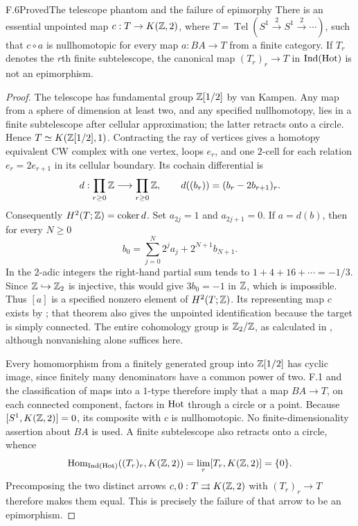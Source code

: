 \begin{claim}{F.6}{Proved}{The telescope phantom and the failure of epimorphy}
There is an essential unpointed map
$c:T\to K(\mathbb Z,2)$, where
$T=\operatorname{Tel}(S^1\xrightarrow{2}S^1\xrightarrow{2}\cdots)$,
such that $c\circ a$ is nullhomotopic for every map $a:BA\to T$
from a finite category. If $T_r$ denotes the $r$th finite
subtelescope, the canonical map $(T_r)_r\to T$ in $\operatorname{Ind}(\mathrm{Hot})$ is
not an epimorphism.
\end{claim}
\begin{proof}
The telescope has fundamental group $\mathbb Z[1/2]$ by van Kampen. Any
map from a sphere of dimension at least two, and any specified
nullhomotopy, lies in a finite subtelescope after cellular
approximation; the latter retracts onto a circle. Hence
$T\simeq K(\mathbb Z[1/2],1)$. Contracting the ray of vertices gives a
homotopy equivalent CW complex with one vertex, loops $e_r$, and
one $2$-cell for each relation $e_r=2e_{r+1}$ in its cellular
boundary. Its cochain differential is
\[
 d:\prod_{r\geq0}\mathbb Z\longrightarrow\prod_{r\geq0}\mathbb Z,
 \qquad d((b_r))=(b_r-2b_{r+1})_r.
\]
Consequently $H^2(T;\mathbb Z)=\operatorname{coker}d$. Set $a_{2j}=1$
and $a_{2j+1}=0$. If $a=d(b)$, then for every $N\geq0$
\[
 b_0=\sum_{j=0}^{N}2^ja_j+2^{N+1}b_{N+1}.
\]
In the $2$-adic integers the right-hand partial sum tends to
$1+4+16+\cdots=-1/3$. Since $\mathbb Z\hookrightarrow\mathbb Z_2$ is injective,
this would give $3b_0=-1$ in $\mathbb Z$, which is impossible. Thus $[a]$
is a specified nonzero element of $H^2(T;\mathbb Z)$. Its representing
map $c$ exists by \citet[Theorem~4.57]{Hatcher2002}; that theorem
also gives the unpointed identification because the target is
simply connected. The entire cohomology group is
$\mathbb Z_2/\mathbb Z$, as calculated in
\citet[Examples~3F.7 and~3F.9]{Hatcher2002}, although nonvanishing
alone suffices here.

Every homomorphism from a finitely generated group into
$\mathbb Z[1/2]$ has cyclic image, since finitely many denominators have
a common power of two. F.1 and the classification of maps into a
$1$-type therefore imply that a map $BA\to T$, on each connected
component, factors in $\mathrm{Hot}$ through a circle or a point.
Because $[S^1,K(\mathbb Z,2)]=0$, its composite with $c$ is nullhomotopic.
No finite-dimensionality assertion about $BA$ is used. A finite
subtelescope also retracts onto a circle, whence
\[
 \operatorname{Hom}_{\operatorname{Ind}(\mathrm{Hot})}((T_r)_r,K(\mathbb Z,2))
       =\lim_r[T_r,K(\mathbb Z,2)]=\{0\}.
\]
Precomposing the two distinct arrows $c,0:T\rightrightarrows K(\mathbb Z,2)$
with $(T_r)_r\to T$ therefore makes them equal. This is precisely
the failure of that arrow to be an epimorphism.
\end{proof}

